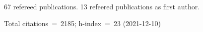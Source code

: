 67 refereed publications. 13 refeered publications as first author.

Total citations~=~2185; h-index~=~23 (2021-12-10)
